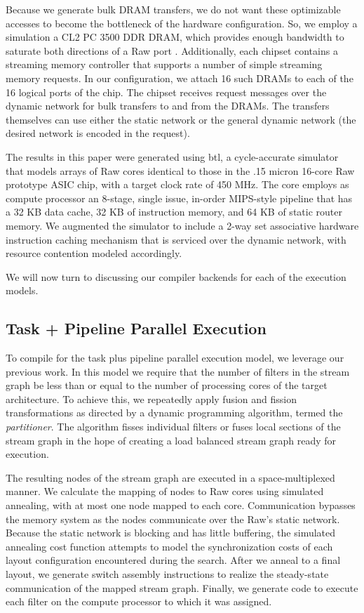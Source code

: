 Because we generate bulk DRAM transfers, we do not want these
optimizable accesses to become the bottleneck of the hardware
configuration.  So, we employ a simulation a CL2 PC 3500 DDR DRAM,
which provides enough bandwidth to saturate both directions of a Raw
port \cite{raw_isca}.  Additionally, each chipset contains a streaming
memory controller that supports a number of simple streaming memory
requests. In our configuration, we attach 16 such DRAMs to each of the
16 logical ports of the chip.  The chipset receives request messages
over the dynamic network for bulk transfers to and from the DRAMs.
The transfers themselves can use either the static network or the
general dynamic network (the desired network is encoded in the
request).

The results in this paper were generated using btl, a cycle-accurate
simulator that models arrays of Raw cores identical to those in the
.15 micron 16-core Raw prototype ASIC chip, with a target clock rate
of 450 MHz. The core employs as compute processor an 8-stage, single
issue, in-order MIPS-style pipeline that has a 32 KB data cache, 32 KB
of instruction memory, and 64 KB of static router memory.  We
augmented the simulator to include a 2-way set associative hardware
instruction caching mechanism that is serviced over the dynamic
network, with resource contention modeled accordingly. 

We will now turn to discussing our compiler backends for each of the
execution models.

\subsection{Task + Pipeline Parallel Execution}
To compile for the task plus pipeline parallel execution model, we
leverage our previous work\cite{streamit-asplos}. In this model we
require that the number of filters in the stream graph be less than or
equal to the number of processing cores of the target architecture.
To achieve this, we repeatedly apply fusion and fission
transformations as directed by a dynamic programming algorithm, termed
the {\it partitioner}.  The algorithm fisses individual filters or
fuses local sections of the stream graph in the hope of creating a
load balanced stream graph ready for execution.

The resulting nodes of the stream graph are executed in a
space-multiplexed manner.  We calculate the mapping of nodes to Raw
cores using simulated annealing, with at most one node mapped to each
core.  Communication bypasses the memory system as the nodes
communicate over the Raw's static network.  Because the static network
is blocking and has little buffering, the simulated annealing cost
function attempts to model the synchronization costs of each layout
configuration encountered during the search.  After we anneal to a
final layout, we generate switch assembly instructions to realize the
steady-state communication of the mapped stream graph.  Finally, we
generate code to execute each filter on the compute processor to which
it was assigned.

